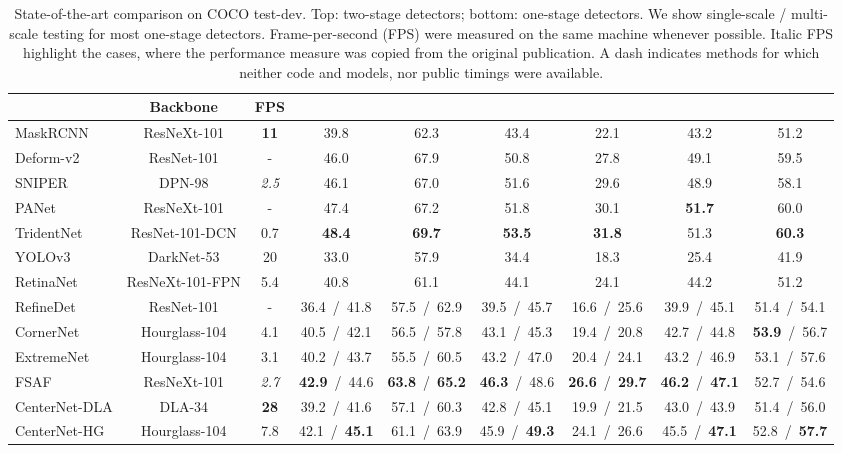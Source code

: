 \documentclass[10pt,twocolumn,letterpaper]{article}
\begin{document}
{
\setlength{\tabcolsep}{5pt}
\begin{table*}[t]
\centering
\begin{tabular}{l@{}c@{\ \ }ccccccc}
\toprule
& Backbone & FPS &  &  &  &  &  &   \\
\midrule
        MaskRCNN~\cite{he2017mask} & ResNeXt-101 & \textbf{11} & 39.8 & 62.3 & 43.4 & 22.1 & 43.2 & 51.2 \\
        Deform-v2~\cite{zhu2018deformable} & ResNet-101 & - & 46.0 & 67.9 & 50.8 & 27.8 & 49.1 & 59.5 \\
        SNIPER~\cite{sniper2018} & DPN-98 & \textit{2.5} & 46.1 & 67.0 & 51.6 & 29.6 & 48.9 & 58.1  \\
        PANet~\cite{liu2018path} & ResNeXt-101 & - &  47.4 & 67.2 & 51.8 & 30.1& \textbf{51.7}& 60.0\\ 
        TridentNet~\cite{li2019scale} & ResNet-101-DCN & 0.7 &  \textbf{48.4} & \textbf{69.7} & \textbf{53.5} & \textbf{31.8} & 51.3 & \textbf{60.3}\\
        \midrule
        YOLOv3~\cite{redmon2018yolov3} & DarkNet-53 & 20 &  33.0 & 57.9 & 34.4&  18.3 & 25.4 & 41.9 \\
        RetinaNet~\cite{lin2018focal} & ResNeXt-101-FPN & 5.4 & 40.8 & 61.1 & 44.1 &  24.1 & 44.2 & 51.2 \\
        RefineDet~\cite{zhang2018single} & ResNet-101 & - &  36.4\ /\ 41.8 & 57.5\ /\ 62.9 & 39.5\ /\ 45.7 &  16.6\ /\ 25.6 & 39.9\ /\ 45.1 & 51.4\ /\ 54.1\\
        CornerNet~\cite{Law_2018_ECCV} & Hourglass-104 & 4.1 &  40.5\ /\ 42.1 & 56.5\ /\ 57.8 & 43.1\ /\ 45.3 &  19.4\ /\ 20.8 & 42.7\ /\ 44.8 & \textbf{53.9}\ /\ 56.7 \\
ExtremeNet~\cite{zhou2019bottomup} & Hourglass-104 & 3.1 &  40.2\ /\ 43.7 & 55.5\ /\ 60.5 & 43.2\ /\ 47.0 &  20.4\ /\ 24.1 & 43.2\ /\ 46.9 & 53.1\ /\ 57.6 \\
FSAF~\cite{zhu2019feature} & ResNeXt-101 & \textit{2.7} & \textbf{42.9}\ /\ 44.6 & \textbf{63.8}\ /\ \textbf{65.2} & \textbf{46.3}\ /\ 48.6 & \textbf{26.6}\ /\ \textbf{29.7} & \textbf{46.2}\ /\ \textbf{47.1} & 52.7\ /\ 54.6 \\
        CenterNet-DLA & DLA-34 &  \textbf{28} &  39.2\ /\ 41.6 & 57.1\ /\ 60.3 & 42.8\ /\ 45.1 &  19.9\ /\ 21.5 & 43.0\ /\ 43.9 & 51.4\ /\ 56.0 \\
        CenterNet-HG & Hourglass-104 & 7.8 & 42.1\ /\ \textbf{45.1} & 61.1\ /\ 63.9 & 45.9\ /\ \textbf{49.3} & 24.1\ /\ 26.6 & 45.5\ /\ \textbf{47.1} & 52.8\ /\ \textbf{57.7}\\
\bottomrule
\end{tabular}
\caption{State-of-the-art comparison on COCO test-dev. Top: two-stage detectors; bottom: one-stage detectors. We show single-scale / multi-scale testing for most one-stage detectors. Frame-per-second (FPS) were measured on the same machine whenever possible. Italic FPS highlight the cases, where the performance measure was copied from the original publication. A dash indicates methods for which neither code and models, nor public timings were available.}
\label{table:main}
\vspace{-1em}
\end{table*}
\setlength{\tabcolsep}{1.4pt}
}
\end{document}
